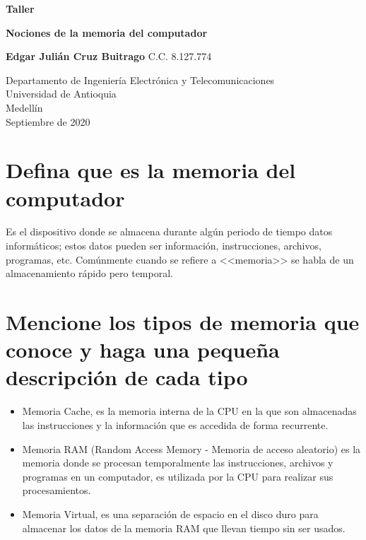 \documentclass{article}
\begin{document}
\begin{titlepage}
    \begin{center}
        \vspace*{1cm}
            
        \Huge
        \textbf{Taller}
            
        \vspace{0.5cm}
         \textbf{Nociones de la memoria del computador}
            
        \vspace{2.5cm}
            
        \textbf{Edgar Julián Cruz Buitrago}
        C.C. 8.127.774
            
        \vfill
            
        \vspace{0.8cm}
            
        \Large
        Departamento de Ingeniería Electrónica y Telecomunicaciones\\
        Universidad de Antioquia\\
        Medellín\\
        Septiembre de 2020
            
    \end{center}
\end{titlepage}

\tableofcontents

\section{Defina que es la memoria del computador}
Es el dispositivo donde se almacena durante algún periodo de tiempo datos informáticos; estos datos pueden ser información, instrucciones, archivos, programas, etc.
Comúnmente cuando se refiere a <<memoria>> se habla de un almacenamiento rápido pero temporal. \cite{augusto}

\section{Mencione los tipos de memoria que conoce y haga una pequeña descripción de cada tipo} 
\begin{itemize}
    \item Memoria Cache, es la memoria interna de la CPU en la que son almacenadas las instrucciones y la información que es accedida de forma recurrente.
    \item Memoria RAM (Random Access Memory - Memoria de acceso aleatorio) es la memoria donde se procesan temporalmente las instrucciones, archivos y programas en un computador, es utilizada por la CPU para realizar sus procesamientos.
    \item Memoria Virtual, es una separación de espacio en el disco duro para almacenar los datos de la memoria RAM que llevan tiempo sin ser usados.\cite{augusto}
\end{itemize}
\end{document}
